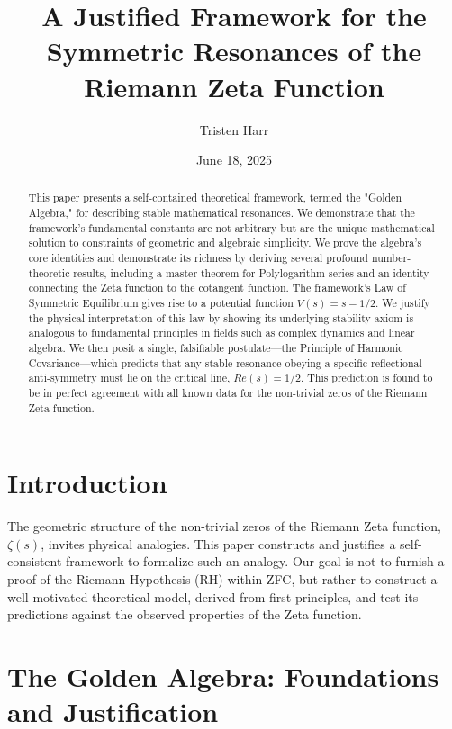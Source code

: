 \documentclass[12pt, letterpaper]{article}
\title{\textbf{A Justified Framework for the Symmetric Resonances of the Riemann Zeta Function}}
\author{Tristen Harr}
\affil{\textit{Saint Charles, Missouri}}
\date{June 18, 2025}
\begin{document}
\maketitle

\begin{abstract}
This paper presents a self-contained theoretical framework, termed the "Golden Algebra," for describing stable mathematical resonances. We demonstrate that the framework's fundamental constants are not arbitrary but are the unique mathematical solution to constraints of geometric and algebraic simplicity. We prove the algebra's core identities and demonstrate its richness by deriving several profound number-theoretic results, including a master theorem for Polylogarithm series and an identity connecting the Zeta function to the cotangent function. The framework's Law of Symmetric Equilibrium gives rise to a potential function $V(s)=s-1/2$. We justify the physical interpretation of this law by showing its underlying stability axiom is analogous to fundamental principles in fields such as complex dynamics and linear algebra. We then posit a single, falsifiable postulate---the Principle of Harmonic Covariance---which predicts that any stable resonance obeying a specific reflectional anti-symmetry must lie on the critical line, $Re(s)=1/2$. This prediction is found to be in perfect agreement with all known data for the non-trivial zeros of the Riemann Zeta function.
\end{abstract}

\section{Introduction}
The geometric structure of the non-trivial zeros of the Riemann Zeta function, $\zeta(s)$, invites physical analogies. This paper constructs and justifies a self-consistent framework to formalize such an analogy. Our goal is not to furnish a proof of the Riemann Hypothesis (RH) within ZFC, but rather to construct a well-motivated theoretical model, derived from first principles, and test its predictions against the observed properties of the Zeta function.

\section{The Golden Algebra: Foundations and Justification}
\end{document}
